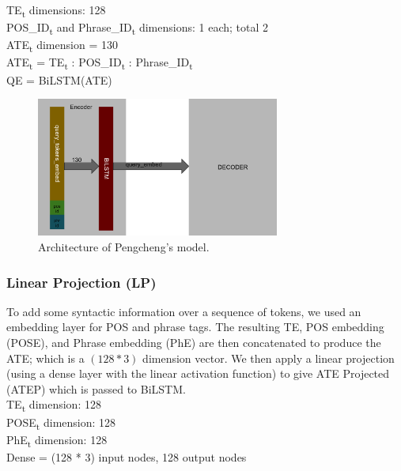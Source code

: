 \documentclass{IEEEtran}
\begin{document}
        \hspace*{-3.5mm}TE\textsubscript{t} dimensions: 128 \\
        POS\_ID\textsubscript{t} and Phrase\_ID\textsubscript{t} dimensions: 1 each; total 2 \\
        ATE\textsubscript{t} dimension = 130 \\

        \hspace*{-3.5mm}ATE\textsubscript{t} = \lbrack TE\textsubscript{t} : 
        POS\_ID\textsubscript{t} : Phrase\_ID\textsubscript{t}\rbrack \\
        QE = BiLSTM(ATE) \\

        \begin{figure}[h]
          \centering
          \includegraphics[width=8cm]{bc.png}
          \caption{Architecture of Pengcheng's model.}
          \label{fig:bc}
        \end{figure}

        \subsubsection{Linear Projection (LP)}
        To add some syntactic information over a sequence of tokens, we used an embedding layer for
        POS and phrase tags. The resulting TE, POS embedding (POSE), and Phrase embedding (PhE) are
        then concatenated to produce the ATE; which is a $ (128 * 3) $ dimension vector. We then
        apply a linear projection (using a dense layer with the linear activation function) to 
        give ATE Projected (ATEP) which is passed to BiLSTM. \\

        \hspace*{-3.5mm}TE\textsubscript{t} dimension: 128 \\
        POSE\textsubscript{t} dimension: 128 \\
        PhE\textsubscript{t} dimension: 128 \\
        Dense = (128 * 3) input nodes, 128 output nodes \\ 
\end{document}
